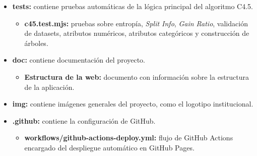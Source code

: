 \begin{itemize}
\begin{itemize}
        \item \textbf{Arbol C4.5:} módulo principal de construcción y poda del árbol de decisión C4.5.
        \begin{itemize}
            \item \textbf{index.html:} página de simulación de construcción del árbol C4.5.
            \item \textbf{poda.html:} página dedicada a la simulación del procedimiento de poda.
            \item \textbf{styles.css:} estilos específicos del módulo del árbol.
            \item \textbf{datasets:} datasets CSV de ejemplo y metadatos asociados.
            \item \textbf{js/c45.mjs:} implementación principal del algoritmo C4.5, validación de filas, cálculo de entropía, ganancia de información, \textit{Split Info}, \textit{Gain Ratio}, construcción del árbol, generación de pasos y poda.
            \item \textbf{js/datasetHandler.js:} gestión de la interfaz del simulador, carga de CSV, renderizado de tablas, árbol SVG, controles de navegación, zoom y vista de poda.
            \item \textbf{js/workspacePanels.js:} gestión de los paneles desplegables del espacio de trabajo.
        \end{itemize}
    \end{itemize}

    \item \textbf{tests:} contiene pruebas automáticas de la lógica principal del algoritmo C4.5.
    \begin{itemize}
        \item \textbf{c45.test.mjs:} pruebas sobre entropía, \textit{Split Info}, \textit{Gain Ratio}, validación de datasets, atributos numéricos, atributos categóricos y construcción de árboles.
    \end{itemize}

    \item \textbf{doc:} contiene documentación del proyecto.
    \begin{itemize}
        \item \textbf{Estructura de la web:} documento con información sobre la estructura de la aplicación.
    \end{itemize}

    \item \textbf{img:} contiene imágenes generales del proyecto, como el logotipo institucional.

    \item \textbf{.github:} contiene la configuración de GitHub.
    \begin{itemize}
        \item \textbf{workflows/github-actions-deploy.yml:} flujo de GitHub Actions encargado del despliegue automático en GitHub Pages.
    \end{itemize}
\end{itemize}

